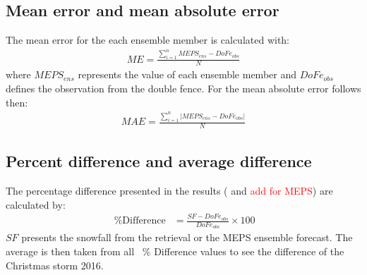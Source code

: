 \subsection{Mean error and mean absolute error}
The mean error for the each ensemble member is calculated with: 
\begin{align}
	ME = \frac{\sum_{i=1}^n MEPS_{ens} - DoFe_{obs}}{N}
\end{align}
where $MEPS_{ens}$ represents the value of each ensemble member and $DoFe_{obs}$ defines the observation from the double fence. For the mean absolute error follows then:
\begin{align}
	MAE = \frac{\sum_{i=1}^n \left| MEPS_{ens} - DoFe_{obs}\right|}{N} \label{eq:MAE}
\end{align}

\subsection{Percent difference and average difference}
The percentage difference presented in the results ( and \textcolor{red}{add for MEPS}) are calculated by:
\begin{align}
	\SI{}{\percent} \text{Difference} & = \frac{SF - DoFe_{obs}}{DoFe_{obs}} \times 100
\end{align}
$SF$ presents the snowfall from the retrieval or the MEPS ensemble forecast. The average is then taken from all \SI{}{\percent} Difference values to see the difference of the Christmas storm 2016.


